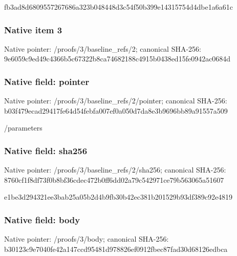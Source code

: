 \documentclass[10pt,a4paper]{article}
\begin{document}
\begingroup\raggedright\sloppy fb3ad8d6809557267686a323b048448d3c54f50b399e14315754d4dbe1a6a61c\par\endgroup

\subsubsection{Native item 3}
Native pointer: /proofs/3/baseline\_\allowbreak{}refs/2; canonical SHA-256: 9e6059c9ed49c4366b5c67322b8ca74682188c4915b0438ed15fe0942ac0684d

\subsubsection{Native field: pointer}
Native pointer: /proofs/3/baseline\_\allowbreak{}refs/2/pointer; canonical SHA-256: b03f479ecad29417fe64d54febfa007ef0a050d7da8e3b9696bb89a91557a509

\begingroup\raggedright\sloppy /\allowbreak{}parameters\par\endgroup

\subsubsection{Native field: sha256}
Native pointer: /proofs/3/baseline\_\allowbreak{}refs/2/sha256; canonical SHA-256: 8760cf1f8df73f0b8bf36cdec472b0ff6dd02a79c542971ce79b563065a51607

\begingroup\raggedright\sloppy e1be3d294321ee3bab25a05b2d4b9fb30b42ec381b201529b93df389c92e4819\par\endgroup

\subsubsection{Native field: body}
Native pointer: /proofs/3/body; canonical SHA-256: b30123c9e7040fe42a147ccd95481d978826ef0912fbec87fad30d68126edbca
\end{document}
